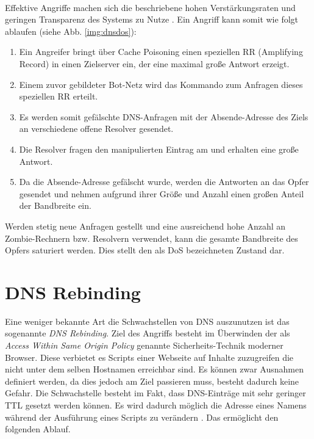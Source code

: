 \paragraph{}
Effektive Angriffe machen sich die beschriebene hohen Verstärkungsraten und geringen Transparenz des Systems zu Nutze \cite{Kambourakis2008}. Ein Angriff kann somit wie folgt ablaufen (siehe Abb. \ref{img:dnsdos}):
\begin{enumerate}[topsep=0pt,itemsep=-1ex,partopsep=1ex,parsep=1ex]
    \item Ein Angreifer bringt über Cache Poisoning einen speziellen RR (Amplifying Record) in einen Zielserver ein, der eine maximal große Antwort erzeigt.
    \item Einem zuvor gebildeter Bot-Netz wird das Kommando zum Anfragen dieses speziellen RR erteilt. 
    \item Es werden somit gefälschte DNS-Anfragen mit der Absende-Adresse des Ziels an verschiedene offene Resolver gesendet.
    \item Die Resolver fragen den manipulierten Eintrag am und erhalten eine große Antwort.
    \item Da die Absende-Adresse gefälscht wurde, werden die Antworten an das Opfer gesendet und nehmen aufgrund ihrer Größe und Anzahl einen großen Anteil der Bandbreite ein. 
\end{enumerate}
Werden stetig neue Anfragen gestellt und eine ausreichend hohe Anzahl an Zombie-Rechnern bzw. Resolvern verwendet, kann die gesamte Bandbreite des Opfers saturiert werden. Dies stellt den als \ac{DoS} bezeichneten Zustand dar.

\section{DNS Rebinding}
\label{sec:attack-dnsrebind}
Eine weniger bekannte Art die Schwachstellen von DNS auszunutzen ist das sogenannte \textit{DNS Rebinding}. Ziel des Angriffs besteht im Überwinden der als \textit{Access Within Same Origin Policy} genannte Sicherheits-Technik moderner Browser. Diese verbietet es Scripts einer Webseite auf Inhalte zuzugreifen die nicht unter dem selben Hostnamen erreichbar sind. Es können zwar Ausnahmen definiert werden, da dies jedoch am Ziel passieren muss, besteht dadurch keine Gefahr. Die Schwachstelle besteht im Fakt, dass DNS-Einträge mit sehr geringer TTL gesetzt werden können. Es wird dadurch möglich die Adresse eines Namens während der Ausführung eines Scripts zu verändern \cite{Jackson2009}. Das ermöglicht den folgenden Ablauf.

